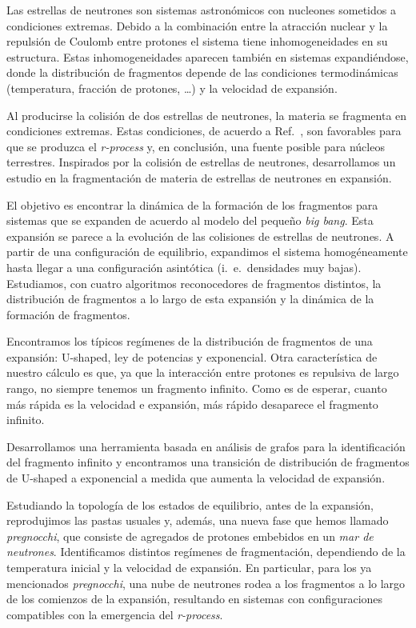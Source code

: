 Las estrellas de neutrones son sistemas astronómicos con nucleones sometidos a condiciones extremas.
Debido a la combinación entre la atracción nuclear y la repulsión de Coulomb entre protones el sistema tiene inhomogeneidades en su estructura.
Estas inhomogeneidades aparecen también en sistemas expandiéndose, donde la distribución de fragmentos depende de las condiciones termodinámicas (temperatura, fracción de protones, \ldots) y la velocidad de expansión.

Al producirse la colisión de dos estrellas de neutrones, la materia se fragmenta en condiciones extremas.
Estas condiciones, de acuerdo a Ref.~\cite{lattimer_black-hole-neutron-star_1974}, son favorables para que se produzca el \emph{r-process} y, en conclusión, una fuente posible para núcleos terrestres.
Inspirados por la colisión de estrellas de neutrones, desarrollamos un estudio en la fragmentación de materia de estrellas de neutrones en expansión.

El objetivo es encontrar la dinámica de la formación de los fragmentos para sistemas que se expanden de acuerdo al modelo del pequeño \emph{big bang}.
Esta expansión se parece a la evolución de las colisiones de estrellas de neutrones.
A partir de una configuración de equilibrio, expandimos el sistema homogéneamente hasta llegar a una configuración asintótica (i.\ e.\ densidades muy bajas).
Estudiamos, con cuatro algoritmos reconocedores de fragmentos distintos, la distribución de fragmentos a lo largo de esta expansión y la dinámica de la formación de fragmentos.

Encontramos los típicos regímenes de la distribución de fragmentos de una expansión: U-shaped, ley de potencias y exponencial.
Otra característica de nuestro cálculo es que, ya que la interacción entre protones es repulsiva de largo rango, no siempre tenemos un fragmento infinito.
Como es de esperar, cuanto más rápida es la velocidad e expansión, más rápido desaparece el fragmento infinito.

Desarrollamos una herramienta basada en análisis de grafos para la identificación del fragmento infinito y encontramos una transición de distribución de fragmentos de U-shaped a exponencial a medida que aumenta la velocidad de expansión.

Estudiando la topología de los estados de equilibrio, antes de la expansión, reprodujimos las pastas usuales y, además, una nueva fase que hemos llamado \emph{pregnocchi}, que consiste de agregados de protones embebidos en un  \emph{mar de neutrones}.
Identificamos distintos regímenes de fragmentación, dependiendo de la temperatura inicial y la velocidad de expansión.
En particular, para los ya mencionados \emph{pregnocchi}, una nube de neutrones rodea a los fragmentos a lo largo de los comienzos de la expansión, resultando en sistemas con configuraciones compatibles con la emergencia del \emph{r-process}.

